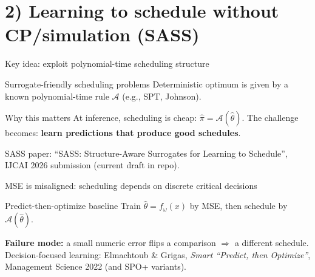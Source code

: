 \documentclass[aspectratio=169,10pt]{beamer}
\newcommand{\btext}[1]{\textbf{\color{darkred}#1}}
\newcommand{\smallref}[1]{{\scriptsize\color{darkgray}#1}}
\begin{document}
\section{2) Learning to schedule without CP/simulation (SASS)}

\begin{frame}{Key idea: exploit polynomial-time scheduling structure}
  \begin{block}{Surrogate-friendly scheduling problems}
    Deterministic optimum is given by a known polynomial-time rule \(\mathcal{A}\)
    (e.g., SPT, Johnson).
  \end{block}
  \vspace{0.15cm}
  \begin{block}{Why this matters}
    At inference, scheduling is cheap: \(\hat{\pi} = \mathcal{A}(\hat{\theta})\).
    The challenge becomes: \btext{learn predictions that produce good schedules}.
  \end{block}
  \smallref{SASS paper: ``SASS: Structure-Aware Surrogates for Learning to Schedule'', IJCAI 2026 submission (current draft in repo).}
\end{frame}

\begin{frame}{MSE is misaligned: scheduling depends on discrete critical decisions}
  \begin{block}{Predict-then-optimize baseline}
    Train \(\hat{\theta}=f_\omega(x)\) by MSE, then schedule by \(\mathcal{A}(\hat{\theta})\).
  \end{block}
  \vspace{0.15cm}
  \btext{Failure mode:} a small numeric error flips a comparison \(\Rightarrow\) a different schedule.
  \vspace{0.15cm}
  \smallref{Decision-focused learning: Elmachtoub \& Grigas, \emph{Smart ``Predict, then Optimize''}, Management Science 2022 (and SPO+ variants).}
\end{frame}
\end{document}
